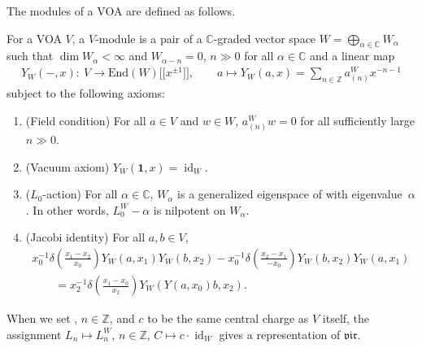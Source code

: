 \documentclass[10pt,a4paper]{amsart}
\numberwithin{equation}{section}
\newcommand{\End}{\mathrm{End}}
\newcommand{\id}{\operatorname{id}}
\newcommand{\bC}{\mathbb{C}}
\newcommand{\bZ}{\mathbb{Z}}
\newcommand{\voaV}{V}
\newcommand{\voagen}{V}
\newcommand{\voamodgen}{W}
\newcommand{\voavac}{\mathbf{1}}
\newcommand{\voaY}{Y}
\newcommand{\voaconf}{\omega}
\newcommand{\vir}{\mathfrak{vir}}
\begin{document}
The modules of a VOA are defined as follows.
\begin{defn}
For a VOA $\voagen$, a $\voagen$-module is a pair of a $\bC$-graded vector space $\voamodgen=\bigoplus_{\alpha \in\bC}\voamodgen_{\alpha}$ such that $\dim\voamodgen_{\alpha}<\infty$ and $W_{\alpha-n}=0$, $n\gg 0$ for all $\alpha\in\bC$ and a linear map
\begin{gather*}
	\voaY_{\voamodgen}(-,x)\colon \ \voagen \to \End (\voamodgen) \big[\big[x^{\pm 1}\big]\big], \qquad
	 a \mapsto \voaY_{\voamodgen}(a,x) = \sum_{n\in\bZ}a^{\voamodgen}_{(n)}x^{-n-1}
\end{gather*}
subject to the following axioms:
\begin{enumerate}\itemsep=0pt
\item[(1)] 	(Field condition) For all $a\in \voagen$ and $w\in \voamodgen$, $a^{\voamodgen}_{(n)}w=0$ for all sufficiently large $n\gg 0$.
\item[(2)] 	(Vacuum axiom) $\voaY_{\voamodgen}(\voavac,x)=\id_{\voamodgen}$.
\item[(3)] 	($L_{0}$-action) For all $\alpha\in\bC$, $\voamodgen_{\alpha}$ is a generalized eigenspace of \smash{$L_{0}^{\voamodgen}\coloneqq\voaconf^{\voamodgen}_{(1)}$} with eigenvalue~$\alpha$. In other words, $L^{\voamodgen}_{0}-\alpha$ is nilpotent on $\voamodgen_{\alpha}$.
\item[(4)] 	(Jacobi identity) For all $a,b\in \voaV$,
	\begin{gather*}
 x_{0}^{-1}\delta \left(\frac{x_{1}-x_{2}}{x_{0}}\right)\voaY_{\voamodgen}(a,x_{1})\voaY_{\voamodgen} (b,x_{2})-x_{0}^{-1}\delta\left(\frac{x_{2}-x_{1}}{-x_{0}}\right)\voaY_{\voamodgen} (b,x_{2})\voaY_{\voamodgen}(a,x_{1}) \\
\qquad = x_{2}^{-1}\delta\left(\frac{x_{1}-x_{0}}{x_{2}}\right)\voaY_{\voamodgen}\left(\voaY(a,x_{0})b,x_{2}\right).
\end{gather*}
\end{enumerate}
\end{defn}

When we set \smash{$L^{\voamodgen}_{n}=\voaconf^{\voamodgen}_{(n+1)}$}, $n\in\bZ$,
and $c$ to be the same central charge as $\voagen$ itself,
the assignment $L_{n}\mapsto L_{n}^{\voamodgen}$, $n\in\bZ$, $C\mapsto c\cdot \id_{\voamodgen}$ gives a representation of $\vir$.
\end{document}
